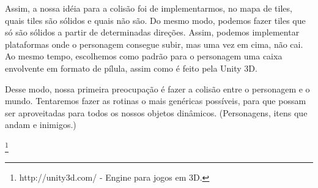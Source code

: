 Assim, a nossa idéia para a colisão foi de implementarmos, no mapa de tiles, quais tiles são sólidos e quais não são. Do mesmo modo, podemos fazer tiles que só são sólidos a partir de determinadas direções. Assim, podemos implementar plataformas onde o personagem consegue subir, mas uma vez em cima, não cai. Ao mesmo tempo, escolhemos como padrão para o personagem uma caixa envolvente em formato de pílula, assim como é feito pela Unity 3D.\footnotemark

Desse modo, nossa primeira preocupação é fazer a colisão entre o personagem e o mundo. Tentaremos fazer as rotinas o mais genéricas possíveis, para que possam ser aproveitadas para todos os nossos objetos dinâmicos. (Personagens, itens que andam e inimigos.)

\footnote{http://unity3d.com/ - Engine para jogos em 3D.}
